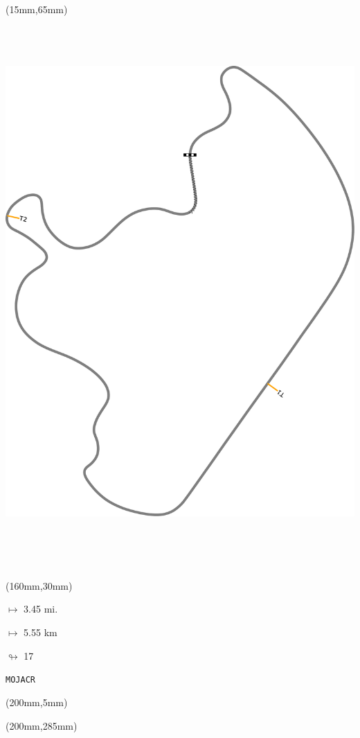 \begin{textblock*}{185mm}(15mm,65mm)%
\centering
\mbox{\includegraphics[width=185mm,height=210mm,keepaspectratio]{PT/MOJACR.pdf}}
\end{textblock*}
\begin{textblock*}{40mm}(160mm,30mm)%
\Large
\par$\mapsto$ 3.45 mi.
\par$\mapsto$ 5.55 km
\par$\looparrowright$ 17
\par\hfill\tiny\tt MOJACR\\
\end{textblock*}
\begin{textblock*}{20mm}(200mm,5mm)%
\fbox{\thepage}
\label{MOJACR}
\end{textblock*}
\begin{textblock*}{20mm}(200mm,285mm)%
\fbox{\thepage}
\end{textblock*}

